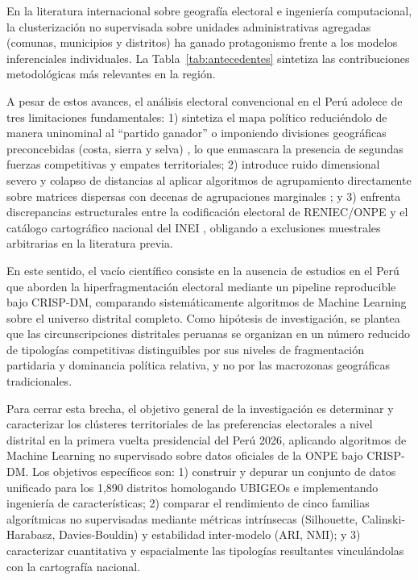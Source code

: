 \documentclass[conference,10pt,letterpaper]{IEEEtran}
\begin{document}
En la literatura internacional sobre geografía electoral e ingeniería computacional, la clusterización no supervisada sobre unidades administrativas agregadas (comunas, municipios y distritos) ha ganado protagonismo frente a los modelos inferenciales individuales. La Tabla~\ref{tab:antecedentes} sintetiza las contribuciones metodológicas más relevantes en la región.



A pesar de estos avances, el análisis electoral convencional en el Perú adolece de tres limitaciones fundamentales: 1) sintetiza el mapa político reduciéndolo de manera uninominal al ``partido ganador'' o imponiendo divisiones geográficas preconcebidas (costa, sierra y selva) \cite{quintanilla2020, encinas2021}, lo que enmascara la presencia de segundas fuerzas competitivas y empates territoriales; 2) introduce ruido dimensional severo y colapso de distancias al aplicar algoritmos de agrupamiento directamente sobre matrices dispersas con decenas de agrupaciones marginales \cite{diaz2025}; y 3) enfrenta discrepancias estructurales entre la codificación electoral de RENIEC/ONPE y el catálogo cartográfico nacional del INEI \cite{inei2026_directorio}, obligando a exclusiones muestrales arbitrarias en la literatura previa.

En este sentido, el vacío científico consiste en la ausencia de estudios en el Perú que aborden la hiperfragmentación electoral mediante un pipeline reproducible bajo CRISP-DM, comparando sistemáticamente algoritmos de Machine Learning sobre el universo distrital completo. Como hipótesis de investigación, se plantea que las circunscripciones distritales peruanas se organizan en un número reducido de tipologías competitivas distinguibles por sus niveles de fragmentación partidaria y dominancia política relativa, y no por las macrozonas geográficas tradicionales.

Para cerrar esta brecha, el objetivo general de la investigación es determinar y caracterizar los clústeres territoriales de las preferencias electorales a nivel distrital en la primera vuelta presidencial del Perú 2026, aplicando algoritmos de Machine Learning no supervisado sobre datos oficiales de la ONPE bajo CRISP-DM. Los objetivos específicos son: 1) construir y depurar un conjunto de datos unificado para los 1,890 distritos homologando UBIGEOs e implementando ingeniería de características; 2) comparar el rendimiento de cinco familias algorítmicas no supervisadas mediante métricas intrínsecas (Silhouette, Calinski-Harabasz, Davies-Bouldin) y estabilidad inter-modelo (ARI, NMI); y 3) caracterizar cuantitativa y espacialmente las tipologías resultantes vinculándolas con la cartografía nacional.
\end{document}
